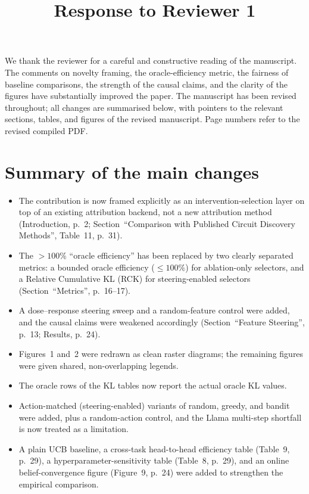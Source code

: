 \documentclass[11pt]{article}
\title{\vspace{-1.5em}Response to Reviewer 1}
\author{}
\date{}
\begin{document}
\maketitle
\vspace{-3em}

\noindent We thank the reviewer for a careful and constructive reading of the
manuscript. The comments on novelty framing, the oracle-efficiency metric, the
fairness of baseline comparisons, the strength of the causal claims, and the
clarity of the figures have substantially improved the paper. The manuscript has
been revised throughout; all changes are summarised below, with pointers to the
relevant sections, tables, and figures of the revised manuscript. Page numbers
refer to the revised compiled PDF.

\section*{Summary of the main changes}
\begin{itemize}[leftmargin=1.4em,itemsep=2pt]
  \item The contribution is now framed explicitly as an intervention-selection
        layer on top of an existing attribution backend, not a new attribution
        method (Introduction, p.~2; Section~``Comparison with Published Circuit
        Discovery Methods'', Table~11, p.~31).
  \item The $>100\%$ ``oracle efficiency'' has been replaced by two clearly
        separated metrics: a bounded oracle efficiency ($\leq 100\%$) for
        ablation-only selectors, and a Relative Cumulative KL (RCK) for
        steering-enabled selectors (Section~``Metrics'', p.~16--17).
  \item A dose--response steering sweep and a random-feature control were added,
        and the causal claims were weakened accordingly (Section~``Feature
        Steering'', p.~13; Results, p.~24).
  \item Figures~1 and~2 were redrawn as clean raster diagrams; the remaining
        figures were given shared, non-overlapping legends.
  \item The oracle rows of the KL tables now report the actual oracle KL values.
  \item Action-matched (steering-enabled) variants of random, greedy, and bandit
        were added, plus a random-action control, and the Llama multi-step
        shortfall is now treated as a limitation.
  \item A plain UCB baseline, a cross-task head-to-head efficiency table
        (Table~9, p.~29), a hyperparameter-sensitivity table (Table~8, p.~29),
        and an online belief-convergence figure (Figure~9, p.~24) were added to
        strengthen the empirical comparison.
\end{itemize}
\end{document}
